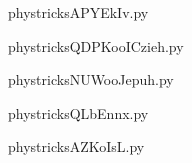     

    \clearpage
    


    \newcommand{\CaptionFigAPYEkIv}{<+Type your caption here+>}
    \begin{center}
        
    \end{center}
    phystricksAPYEkIv.py

    

    \clearpage
    


    \newcommand{\CaptionFigQDPKooICzieh}{<+Type your caption here+>}
    \begin{center}
        
    \end{center}
    phystricksQDPKooICzieh.py

    

    \clearpage
    


    \newcommand{\CaptionFigNUWooJepuh}{<+Type your caption here+>}
    \begin{center}
        
    \end{center}
    phystricksNUWooJepuh.py

    

    \clearpage
    


    \newcommand{\CaptionFigQLbEnnx}{<+Type your caption here+>}
    \begin{center}
        
    \end{center}
    phystricksQLbEnnx.py

    

    \clearpage
    


    \newcommand{\CaptionFigAZKoIsL}{<+Type your caption here+>}
    \begin{center}
        
    \end{center}
    phystricksAZKoIsL.py

    

    \clearpage
    


